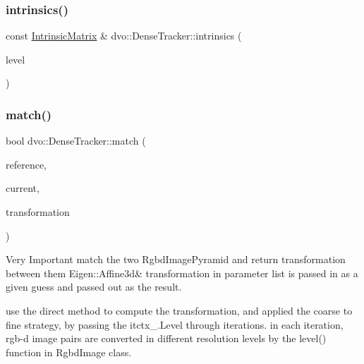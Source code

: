 \mbox{\label{classdvo_1_1_dense_tracker_a55d2374fbb13ef7846a535e1869fb880}} 
\subsubsection{\texorpdfstring{intrinsics()}{intrinsics()}}
{\footnotesize\ttfamily const \mbox{\hyperlink{structdvo_1_1core_1_1_intrinsic_matrix}{Intrinsic\+Matrix}} \& dvo\+::\+Dense\+Tracker\+::intrinsics (\begin{DoxyParamCaption}\item[{size\+\_\+t}]{level }\end{DoxyParamCaption})}

\mbox{\label{classdvo_1_1_dense_tracker_a120bade1d07eb480e7334524b3db8383}} 
\subsubsection{\texorpdfstring{match()}{match()}}
{\footnotesize\ttfamily bool dvo\+::\+Dense\+Tracker\+::match (\begin{DoxyParamCaption}\item[{\mbox{\hyperlink{structdvo_1_1core_1_1_rgbd_image_pyramid}{dvo\+::core\+::\+Rgbd\+Image\+Pyramid}} \&}]{reference,  }\item[{\mbox{\hyperlink{structdvo_1_1core_1_1_rgbd_image_pyramid}{dvo\+::core\+::\+Rgbd\+Image\+Pyramid}} \&}]{current,  }\item[{Eigen\+::\+Affine3d \&}]{transformation }\end{DoxyParamCaption})}

Very Important match the two Rgbd\+Image\+Pyramid and return transformation between them Eigen\+::\+Affine3d\& transformation in parameter list is passed in as a given guess and passed out as the result.

use the direct method to compute the transformation, and applied the coarse to fine strategy, by passing the itctx\+\_\+.\+Level through iterations. in each iteration, rgb-\/d image pairs are converted in different resolution levels by the level() function in Rgbd\+Image class. \mbox{\label{classdvo_1_1_dense_tracker_ae4b3faebac29274632ce464b7b016efe}} 
